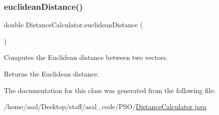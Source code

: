 \subsubsection{\texorpdfstring{euclidean\+Distance()}{euclideanDistance()}}
{\footnotesize\ttfamily double Distance\+Calculator.\+euclidean\+Distance (\begin{DoxyParamCaption}{ }\end{DoxyParamCaption})}

Computes the Euclidean distance between two vectors. \begin{DoxyReturn}{Returns}
the Euclidean distance. 
\end{DoxyReturn}


The documentation for this class was generated from the following file\+:\begin{DoxyCompactItemize}
\item 
/home/asal/\+Desktop/staff/asal\+\_\+code/\+P\+S\+O/\hyperlink{_distance_calculator_8java}{Distance\+Calculator.\+java}\end{DoxyCompactItemize}
